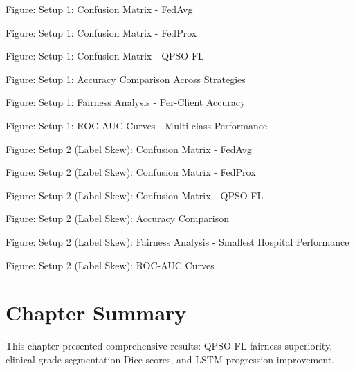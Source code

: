 Figure: Setup 1: Confusion Matrix - FedAvg

Figure: Setup 1: Confusion Matrix - FedProx

Figure: Setup 1: Confusion Matrix - QPSO-FL

Figure: Setup 1: Accuracy Comparison Across Strategies

Figure: Setup 1: Fairness Analysis - Per-Client Accuracy

Figure: Setup 1: ROC-AUC Curves - Multi-class Performance

Figure: Setup 2 (Label Skew): Confusion Matrix - FedAvg

Figure: Setup 2 (Label Skew): Confusion Matrix - FedProx

Figure: Setup 2 (Label Skew): Confusion Matrix - QPSO-FL

Figure: Setup 2 (Label Skew): Accuracy Comparison

Figure: Setup 2 (Label Skew): Fairness Analysis - Smallest Hospital Performance

Figure: Setup 2 (Label Skew): ROC-AUC Curves


\section{Chapter Summary}
This chapter presented comprehensive results: QPSO-FL fairness superiority, clinical-grade segmentation Dice scores, and LSTM progression improvement.
